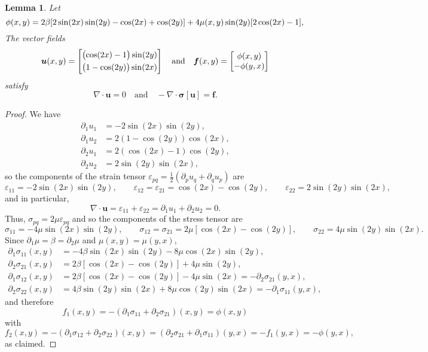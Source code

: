 \documentclass[a4paper,12pt]{article}
\newcommand{\bs}[1]{\boldsymbol{#1}}
\newtheorem{lemma}[theorem]{Lemma}
\begin{document}
\begin{lemma}\label{lem: elasticity div free soln}
Let
\[
\phi(x,y)=2\beta[2\sin(2x)\sin(2y)-\cos(2x)+\cos(2y)]
    +4\mu(x,y)\sin(2y)[2\cos(2x)-1],\\
\]
The vector fields
\[
\bs{u}(x,y)=\begin{bmatrix}
\bigl(\cos(2x)-1\bigr)\sin(2y)\\[1\jot]
\bigl(1-\cos(2y)\bigr)\sin(2x)\end{bmatrix}
\quad\text{and}\quad
\bs{f}(x,y)=\begin{bmatrix}\phi(x,y)\\ -\phi(y,x)\end{bmatrix}
\]
satisfy
\[
\nabla\cdot\bs{u}=0\quad\text{and}\quad
-\nabla\cdot\bs{\sigma}[\bs{u}]=\bs{f}.
\]
\end{lemma}
\begin{proof}
We have
\begin{align*}
\partial_1u_1&=-2\sin(2x)\sin(2y),\\
\partial_1u_2&=2(1-\cos(2y))\cos(2x),\\
\partial_2u_1&=2(\cos(2x)-1)\cos(2y),\\
\partial_2u_2&=2\sin(2y)\sin(2x),
\end{align*}
so the components of the strain tensor
$\varepsilon_{pq}=\tfrac12(\partial_pu_q+\partial_qu_p)$ are
\[
\varepsilon_{11}=-2\sin(2x)\sin(2y),\qquad
\varepsilon_{12}=\varepsilon_{21}=\cos(2x)-\cos(2y),\qquad
\varepsilon_{22}=2\sin(2y)\sin(2x),
\]
and in particular,
\[
\nabla\cdot\bs{u}=\varepsilon_{11}+\varepsilon_{22}
    =\partial_1u_1+\partial_2u_2=0.
\]
Thus, $\sigma_{pq}=2\mu\varepsilon_{pq}$ and so the components of the stress
tensor are
\[
\sigma_{11}=-4\mu\sin(2x)\sin(2y),\qquad
\sigma_{12}=\sigma_{21}=2\mu[\cos(2x)-\cos(2y)],\qquad
\sigma_{22}=4\mu\sin(2y)\sin(2x).
\]
Since $\partial_1\mu=\beta=\partial_2\mu$ and $\mu(x,y)=\mu(y,x)$,
\begin{align*}
\partial_1\sigma_{11}(x,y)&=-4\beta\sin(2x)\sin(2y)-8\mu\cos(2x)\sin(2y),\\
\partial_2\sigma_{21}(x,y)&=2\beta[\cos(2x)-\cos(2y)]+4\mu\sin(2y),\\
\partial_1\sigma_{12}(x,y)&=2\beta[\cos(2x)-\cos(2y)]-4\mu\sin(2x)
    =-\partial_2\sigma_{21}(y,x),\\
\partial_2\sigma_{22}(x,y)&=4\beta\sin(2y)\sin(2x)+8\mu\cos(2y)\sin(2x)
    =-\partial_1\sigma_{11}(y,x),
\end{align*}
and therefore
\[
f_1(x,y)=-(\partial_1\sigma_{11}+\partial_2\sigma_{21})(x,y)=\phi(x,y)
\]
with
\[
f_2(x,y)=-(\partial_1\sigma_{12}+\partial_2\sigma_{22})(x,y)
=(\partial_2\sigma_{21}+\partial_1\sigma_{11})(y,x)=-f_1(y,x)=-\phi(y,x),
\]
as claimed.
\end{proof}
\end{document}
